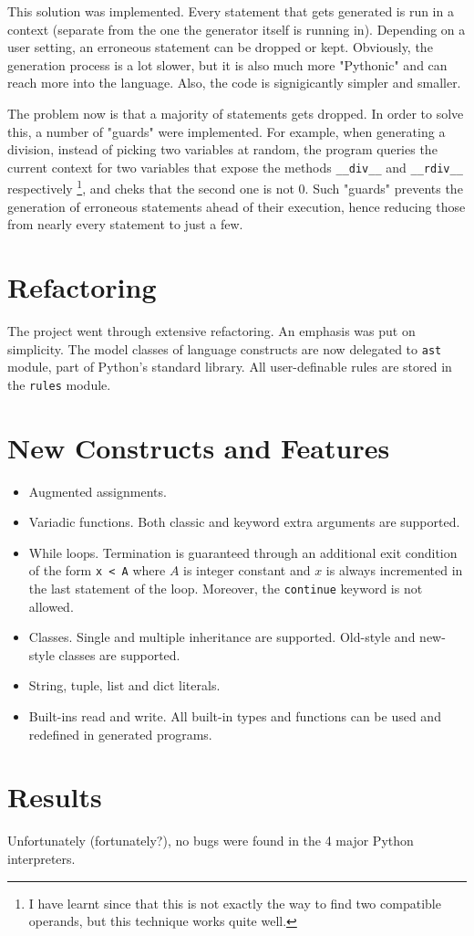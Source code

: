\documentclass[10pt,twocolumn]{article}
\begin{document}
This solution was implemented. Every statement that gets generated is run in a 
context (separate from the one the generator itself is running in). Depending on
a user setting, an erroneous statement can be dropped or kept. Obviously, the 
generation process is a lot slower, but it is also much more "Pythonic" and 
can reach more into the language. Also, the code is signigicantly simpler and 
smaller.

The problem now is that a majority of statements gets dropped. In order to solve
this, a number of "guards" were implemented. For example, when generating a 
division, instead of picking two variables at random, the program 
queries the current context for two variables that expose the methods \verb|__div__| and 
\verb|__rdiv__| respectively \footnote{I have learnt since that this is not 
exactly the way to find two compatible operands, but this technique works quite well.}, 
and cheks that the second one is not 0. Such "guards" prevents the generation 
of erroneous statements ahead of their execution, hence reducing those from nearly 
every statement to just a few.

\section*{Refactoring}

The project went through extensive refactoring. An emphasis was put on 
simplicity. The model classes of language constructs
are now delegated to \verb|ast| module, part of Python's standard library. All 
user-definable rules are stored in the \verb|rules| module.

\section*{New Constructs and Features}

\begin{itemize}
	\item{Augmented assignments.}
	\item{Variadic functions. Both classic and keyword extra arguments are 
		supported.}
	\item{While loops. Termination is guaranteed through an additional exit 
		condition of the form \verb|x < A| where $A$ is integer constant and $x$ is 
		always incremented in the last statement of the loop. Moreover, the 
		\verb|continue| keyword is not allowed.}
	\item{Classes. Single and multiple inheritance are supported. Old-style and
		new-style classes are supported.}
	\item{String, tuple, list and dict literals.}
	\item{Built-ins read and write. All built-in types and functions can be used
		and redefined in generated programs.}
\end{itemize}

\section*{Results}

Unfortunately (fortunately?), no bugs were found in the 4 major Python
interpreters.
\end{document}

